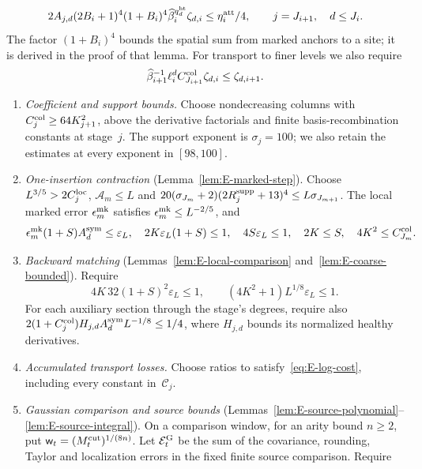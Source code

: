 \begin{equation}\label{eq:E-attachment-allowance}
 2A_{j,d}(2B_i+1)^4(1+B_i)^4
 \widehat\beta_i^{q^{\rm ht}_d}\zeta_{d,i}\le\eta^{\rm att}_i/4,
 \qquad j=J_{i+1},\quad d\le J_i.
\end{equation}
The factor $(1+B_i)^4$ bounds the spatial sum from marked anchors to a site; it is derived in the proof of that lemma. For transport to finer levels we also require
\begin{equation}\label{eq:E-source-allowance-transport}
 \widehat\beta_{i+1}^{-1}\ell_i^d C^{\rm col}_{J_{i+1}}\zeta_{d,i}
 \le\zeta_{d,i+1}.
\end{equation}
\begin{enumerate}
\item\label{it:E-columns} \emph{Coefficient and support bounds.} Choose nondecreasing columns with $C^{\rm col}_j\ge64K_{j+1}^2$, above the derivative factorials and finite basis-recombination constants at stage~$j$. The support exponent is $\sigma_j=100$; we also retain the estimates at every exponent in $[98,100]$.
\item\label{it:E-graph} \emph{One-insertion contraction} (Lemma~\ref{lem:E-marked-step}). Choose $L^{3/5}>2C_j^{\rm loc}$, $\mathcal A_m\le L$ and $20(\sigma_{J_m}+2)(2R_j^{\rm supp}+13)^4\le L\sigma_{J_{m+1}}$. The local marked error $\epsilon^{\rm mk}_m$ satisfies $\epsilon^{\rm mk}_m\le L^{-2/5}$, and
\begin{equation}\label{eq:E-graph-reserve}
 \epsilon^{\rm mk}_m(1+S)A_d^{\rm sym}\le\varepsilon_L,\quad
 2K\varepsilon_L(1+S)\le1,\quad4S\varepsilon_L\le1,\quad
 2K\le S,\quad4K^2\le C^{\rm col}_{J_m}.
\end{equation}
\item\label{it:E-match} \emph{Backward matching} (Lemmas~\ref{lem:E-local-comparison} and~\ref{lem:E-coarse-bounded}). Require
\begin{equation}\label{eq:E-matching-choices}
 4K\,32(1+S)^2\varepsilon_L\le1,\qquad
 (4K^2+1)L^{1/8}\varepsilon_L\le1.
\end{equation}
For each auxiliary section through the stage's degrees, require also $2(1+C^{\rm col}_j)H_{j,d}A_d^{\rm sym}L^{-1/8}\le1/4$, where $H_{j,d}$ bounds its normalized healthy derivatives.
\item\label{it:E-log} \emph{Accumulated transport losses.} Choose ratios to satisfy~\eqref{eq:E-log-cost}, including every constant in~$\mathcal C_j$.
\item\label{it:E-entries} \emph{Gaussian comparison and source bounds} (Lemmas~\ref{lem:E-source-polynomial}--\ref{lem:E-source-integral}). On a comparison window, for an arity bound $n\ge2$, put $\mathsf w_t=(M^{\mathrm{cut}}_t)^{1/(8n)}$. Let $\mathcal E_t^{\rm G}$ be the sum of the covariance, rounding, Taylor and localization errors in the fixed finite source comparison. Require

\end{enumerate}
